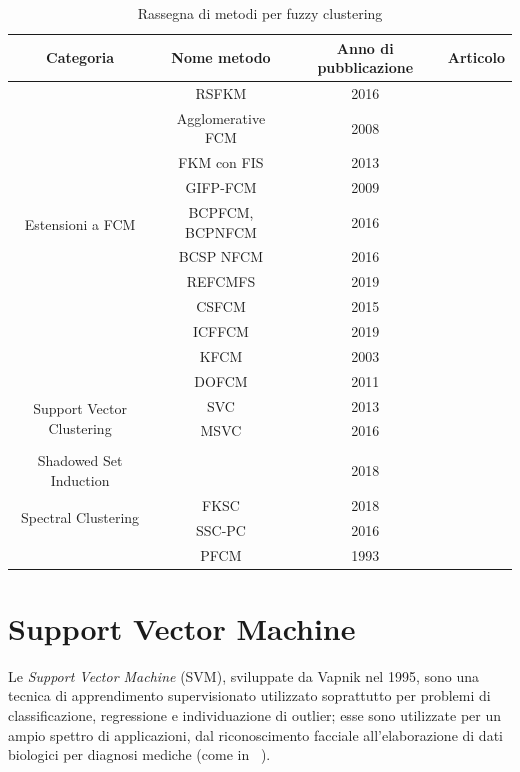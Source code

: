 \documentclass[oneside, openany]{book}
\begin{document}
		\begin{table}[h!]
			\caption{Rassegna di metodi per fuzzy clustering}
			\begin{center}\begin{tabular}{ |c|c|c|c| } 
					\hline
					Categoria & Nome metodo & Anno di pubblicazione & Articolo\\
					\hline
					\multirow{10}{4em}{Estensioni a FCM} 
					& RSFKM & 2016 & \cite{bib:rsfkm}\\ 
					& Agglomerative FCM & 2008 & \cite{bib:afkm}\\
					& FKM con FIS & 2013 & \cite{bib:fkmfis}\\ 
					& GIFP-FCM & 2009 & \cite{bib:gifpfcm}\\
					& BCPFCM, BCPNFCM & 2016 & \cite{bib:bcpfcm}\\
					& BCSP NFCM & 2016 & \cite{bib:bcpfcm}\\
					& REFCMFS & 2019 & \cite{bib:refcmfs}\\ 
					& CSFCM & 2015 & \cite{bib:csfcm}\\
					& ICFFCM & 2019 &\cite{bib:icffcm}\\
					& KFCM & 2003 &\cite{bib:kfcm}\\
					& DOFCM & 2011 & \cite{bib:dofcm}\\
					\hline													
					\multirow{2}{4em}{Support Vector Clustering}	& SVC & 2013 & \cite{bib:svc}\\ 
					& MSVC & 2016 & \cite{bib:msvc}\\ 
					&  &  & \\
					\hline
					\multirow{3}{4em}{Shadowed Set Induction} & & & \\
					&  & 2018 & \cite{bib:ssi}\\
					& & & \\	
					\hline
					\multirow{2}{4em}{Spectral Clustering}	& FKSC & 2018 & \cite{bib:fksc}\\ 
					& SSC-PC & 2016 & \cite{bib:sscpc}\\ 
					\hline
					& PFCM & 1993 & \cite{bib:pfcm}\\
					\hline
				\end{tabular}
			\end{center}
			\label{tab:clustering}	
		\end{table}
	
	\section{Support Vector Machine}
	Le \textit{Support Vector Machine} (SVM), sviluppate da Vapnik nel 1995, sono una tecnica di apprendimento supervisionato utilizzato soprattutto per problemi di classificazione, regressione e individuazione di outlier; esse sono utilizzate per un ampio spettro di applicazioni, dal riconoscimento facciale \cite{bib:svmfr, bib:svmfr2} all'elaborazione di dati biologici per diagnosi mediche (come in ~\cite{bib:svmmed,bib:svmmed2}).
	
\end{document}
